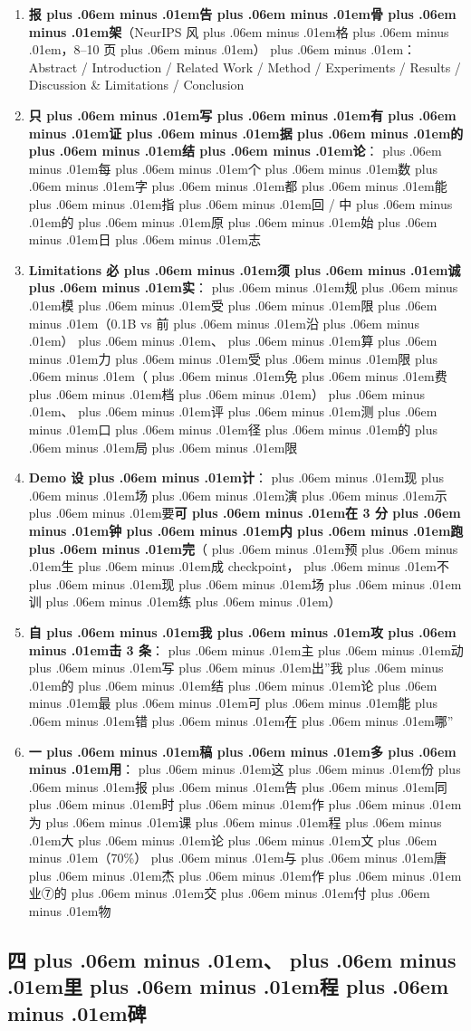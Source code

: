 \documentclass[
]{article}
\newcommand{\passthrough}[1]{#1}
\providecommand{\tightlist}{%
  \setlength{\itemsep}{0pt}\setlength{\parskip}{0pt}}
\def\zh#1{{\zhfont #1}}
\def\sym#1{{\symfont #1}}
\def\codezh#1{{\zhmonofont #1}}
\def\zhglue{\hskip0pt plus .06em minus .01em}
\begin{document}
\begin{enumerate}
\def\labelenumi{\arabic{enumi}.}
\tightlist
\item
  \textbf{\zh{报\zhglue 告\zhglue 骨\zhglue 架}}\zh{（}NeurIPS \zh{风\zhglue 格\zhglue ，}8--10 \zh{页\zhglue ）\zhglue ：}Abstract / Introduction / Related Work / Method / Experiments / Results / Discussion \& Limitations / Conclusion
\item
  \textbf{\zh{只\zhglue 写\zhglue 有\zhglue 证\zhglue 据\zhglue 的\zhglue 结\zhglue 论}}\zh{：\zhglue 每\zhglue 个\zhglue 数\zhglue 字\zhglue 都\zhglue 能\zhglue 指\zhglue 回} \passthrough{\codezh{{\zh{证}}{\zh{据}}/}} \zh{中\zhglue 的\zhglue 原\zhglue 始\zhglue 日\zhglue 志}
\item
  \textbf{Limitations \zh{必\zhglue 须\zhglue 诚\zhglue 实}}\zh{：\zhglue 规\zhglue 模\zhglue 受\zhglue 限\zhglue （}0.1B vs \zh{前\zhglue 沿\zhglue ）\zhglue 、\zhglue 算\zhglue 力\zhglue 受\zhglue 限\zhglue （\zhglue 免\zhglue 费\zhglue 档\zhglue ）\zhglue 、\zhglue 评\zhglue 测\zhglue 口\zhglue 径\zhglue 的\zhglue 局\zhglue 限}
\item
  \textbf{Demo \zh{设\zhglue 计}}\zh{：\zhglue 现\zhglue 场\zhglue 演\zhglue 示\zhglue 要}\textbf{\zh{可\zhglue 在} 3 \zh{分\zhglue 钟\zhglue 内\zhglue 跑\zhglue 完}}\zh{（\zhglue 预\zhglue 生\zhglue 成} checkpoint\zh{，\zhglue 不\zhglue 现\zhglue 场\zhglue 训\zhglue 练\zhglue ）}
\item
  \textbf{\zh{自\zhglue 我\zhglue 攻\zhglue 击} 3 \zh{条}}\zh{：\zhglue 主\zhglue 动\zhglue 写\zhglue 出}''\zh{我\zhglue 的\zhglue 结\zhglue 论\zhglue 最\zhglue 可\zhglue 能\zhglue 错\zhglue 在\zhglue 哪}''
\item
  \textbf{\zh{一\zhglue 稿\zhglue 多\zhglue 用}}\zh{：\zhglue 这\zhglue 份\zhglue 报\zhglue 告\zhglue 同\zhglue 时\zhglue 作\zhglue 为\zhglue 课\zhglue 程\zhglue 大\zhglue 论\zhglue 文\zhglue （}70\%\zh{）\zhglue 与\zhglue 唐\zhglue 杰\zhglue 作\zhglue 业}\sym{⑦}\zh{的\zhglue 交\zhglue 付\zhglue 物}
\end{enumerate}

\subsection{\zh{四\zhglue 、\zhglue 里\zhglue 程\zhglue 碑}}\label{ux56dbux91ccux7a0bux7891-9}
\end{document}
